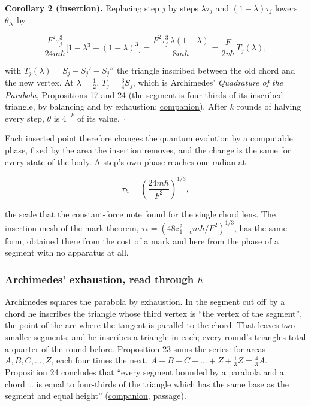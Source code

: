 \documentclass[11pt,a4paper]{article}
\begin{document}
\textbf{Corollary 2 (insertion).} Replacing step \(j\) by steps
\(\lambda\tau_j\) and \((1-\lambda)\tau_j\) lowers \(\theta_N\) by

\[\frac{F^2\tau_j^3}{24m\hbar}\bigl[1-\lambda^3-(1-\lambda)^3\bigr]
=\frac{F^2\tau_j^3\,\lambda(1-\lambda)}{8m\hbar}
=\frac{F}{2v\hbar}\,T_j(\lambda),\]

with \(T_j(\lambda)=S_j-S_j'-S_j''\) the triangle inscribed between the
old chord and the new vertex. At \(\lambda=\frac12\),
\(T_j=\frac34S_j\), which is Archimedes' \emph{Quadrature of the
Parabola}, Propositions 17 and 24 (the segment is four thirds of its
inscribed triangle, by balancing and by exhaustion;
\href{../docs/classics/Archimedes_QuadratureParabola_Heath1897_OCR.md}{companion}).
After \(k\) rounds of halving every step, \(\theta\) is \(4^{-k}\) of
its value. \(\square\)

Each inserted point therefore changes the quantum evolution by a
computable phase, fixed by the area the insertion removes, and the
change is the same for every state of the body. A step's own phase
reaches one radian at

\[\tau_\hbar=\left(\frac{24m\hbar}{F^2}\right)^{1/3},\]

the scale that the constant-force note found for the single chord lens.
The insertion mesh of the mark theorem,
\(\tau_*=(48z_{1-\epsilon}^2m\hbar/F^2)^{1/3}\), has the same form,
obtained there from the cost of a mark and here from the phase of a
segment with no apparatus at all.

\hypertarget{archimedes-exhaustion-read-through-hbar}{%
\subsubsection{\texorpdfstring{Archimedes' exhaustion, read through
\(\hbar\)}{Archimedes' exhaustion, read through \textbackslash hbar}}\label{archimedes-exhaustion-read-through-hbar}}

Archimedes squares the parabola by exhaustion. In the segment cut off by
a chord he inscribes the triangle whose third vertex is ``the vertex of
the segment'', the point of the arc where the tangent is parallel to the
chord. That leaves two smaller segments, and he inscribes a triangle in
each; every round's triangles total a quarter of the round before.
Proposition 23 sums the series: for areas \(A,B,C,\dots,Z\), each four
times the next, \(A+B+C+\dots+Z+\frac13Z=\frac43A\). Proposition 24
concludes that ``every segment bounded by a parabola and a chord
\ldots{} is equal to four-thirds of the triangle which has the same base
as the segment and equal height''
(\href{../docs/classics/Archimedes_QuadratureParabola_Heath1897_OCR.md}{companion},
passage).
\end{document}
